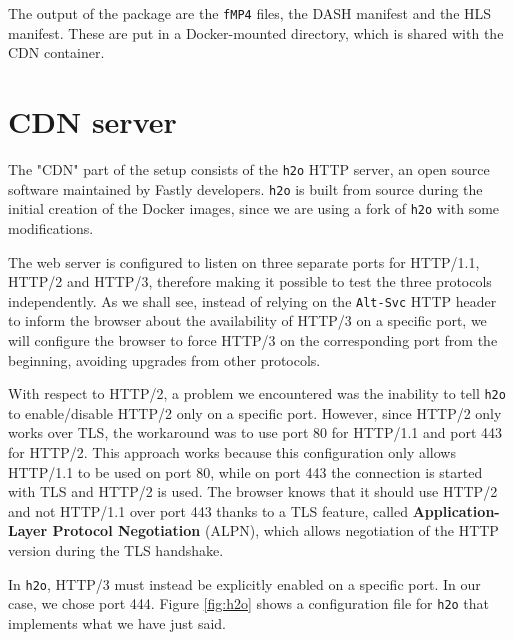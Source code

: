 The output of the package are the \texttt{fMP4} files, the DASH manifest and the HLS manifest. These are put in a Docker-mounted directory, which is shared with the CDN container.

\section{CDN server}
\label{sec:testbed/cdn}

The "CDN" part of the setup consists of the \texttt{h2o} HTTP server, an open source software maintained by Fastly developers. \texttt{h2o} is built from source during the initial creation of the Docker images, since we are using a fork of \texttt{h2o} with some modifications.

The web server is configured to listen on three separate ports for HTTP/1.1, HTTP/2 and HTTP/3, therefore making it possible to test the three protocols independently. As we shall see, instead of relying on the \texttt{Alt-Svc} HTTP header to inform the browser about the availability of HTTP/3 on a specific port, we will configure the browser to force HTTP/3 on the corresponding port from the beginning, avoiding upgrades from other protocols.

With respect to HTTP/2, a problem we encountered was the inability to tell \texttt{h2o} to enable/disable HTTP/2 only on a specific port. However, since HTTP/2 only works over TLS, the workaround was to use port 80 for HTTP/1.1 and port 443 for HTTP/2. This approach works because this configuration only allows HTTP/1.1 to be used on port 80, while on port 443 the connection is started with TLS and HTTP/2 is used. The browser knows that it should use HTTP/2 and not HTTP/1.1 over port 443 thanks to a TLS feature, called \textbf{Application-Layer Protocol Negotiation} (ALPN), which allows negotiation of the HTTP version during the TLS handshake.

In \texttt{h2o}, HTTP/3 must instead be explicitly enabled on a specific port. In our case, we chose port 444. Figure \ref{fig:h2o} shows a configuration file for \texttt{h2o} that implements what we have just said.


